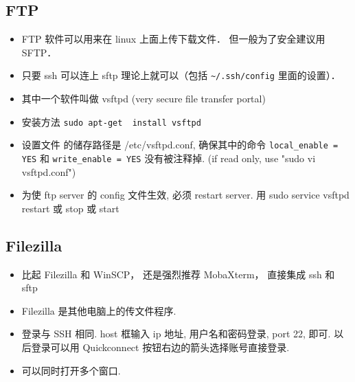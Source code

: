 
\subsection{FTP}
\begin{itemize}
\item FTP 软件可以用来在 linux 上面上传下载文件． 但一般为了安全建议用 SFTP．
\item 只要 ssh 可以连上 sftp 理论上就可以（包括 \verb|~/.ssh/config| 里面的设置）．
\item 其中一个软件叫做 vsftpd (very secure file transfer portal)
\item 安装方法 \verb`sudo apt-get  install vsftpd`
\item 设置文件 的储存路径是 /etc/vsftpd.conf, 确保其中的命令 \verb|local_enable = YES| 和 \verb|write_enable = YES|  没有被注释掉.
(if read only, use "sudo vi vsftpd.conf")
\item 为使 ftp server 的 config 文件生效, 必须 restart server. 用 sudo service vsftpd restart 或 stop 或 start
\end{itemize}

\subsection{Filezilla}
\begin{itemize}
\item 比起 Filezilla 和 WinSCP， 还是强烈推荐 MobaXterm， 直接集成 ssh 和 sftp
\item Filezilla 是其他电脑上的传文件程序.
\item 登录与 SSH 相同. host 框输入 ip 地址, 用户名和密码登录, port 22, 即可. 以后登录可以用 Quickconnect 按钮右边的箭头选择账号直接登录.
\item 可以同时打开多个窗口.
\end{itemize}


